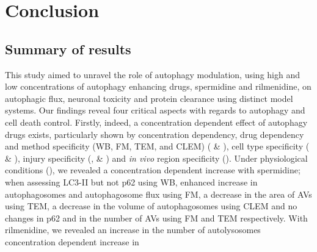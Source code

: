 \chapter{Conclusion}
\section{Summary of results}
This study aimed to unravel the role of autophagy modulation, using high and low concentrations of autophagy enhancing drugs, spermidine and rilmenidine, on autophagic flux, neuronal toxicity and protein clearance using distinct model systems. Our findings reveal four critical aspects with regards to autophagy and cell death control. Firstly, indeed, a concentration dependent effect of autophagy drugs exists, particularly shown by concentration dependency, drug dependency and method specificity (WB, FM, TEM, and CLEM) ( \& ), cell type specificity ( \& ), injury specificity (,  \& ) and \textit{in vivo} region specificity (). Under physiological conditions (), we revealed a concentration dependent increase with spermidine; when assessing LC3-II but not p62 using WB, enhanced increase in autophagosomes and autophagosome flux using FM, a decrease in the area of AVs using TEM, a decrease in the volume of autophagosomes using CLEM and no changes in p62 and in the number of AVs using FM and TEM respectively. With rilmenidine, we revealed an increase in the number of autolysosomes  concentration dependent increase in 

